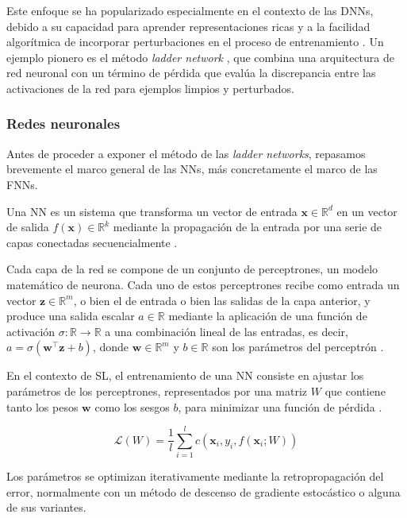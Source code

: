 Este enfoque se ha popularizado especialmente en el contexto de las \glspl{DNN}, debido a su capacidad para aprender representaciones ricas y a la facilidad algorítmica de incorporar perturbaciones en el proceso de entrenamiento \cite{van2020survey}. Un ejemplo pionero es el método \textit{ladder network} \cite{rasmus2015semi}, que combina una arquitectura de red neuronal con un término de pérdida que evalúa la discrepancia entre las activaciones de la red para ejemplos limpios y perturbados.

\subsubsection{Redes neuronales}

Antes de proceder a exponer el método de las \textit{ladder networks}, repasamos brevemente el marco general de las \glspl{NN}, más concretamente el marco de las \glspl{FNN}. 

Una \gls{NN} es un sistema que transforma un vector de entrada $\mathbf{x}\in\mathbb{R}^d$ en un vector de salida $f(\mathbf{x})\in\mathbb{R}^k$ mediante la propagación de la entrada por una serie de capas conectadas secuencialmente \cite{van2020survey}.

Cada capa de la red se compone de un conjunto de perceptrones, un modelo matemático de neurona. Cada uno de estos perceptrones recibe como entrada un vector $\mathbf{z}\in\mathbb{R}^m$, o bien el de entrada o bien las salidas de la capa anterior, y produce una salida escalar $a\in\mathbb{R}$ mediante la aplicación de una función de activación $\sigma:\mathbb{R}\to\mathbb{R}$ a una combinación lineal de las entradas, es decir, $a=\sigma(\mathbf{w}^{\top}\mathbf{z}+b)$, donde $\mathbf{w}\in\mathbb{R}^m$ y $b\in\mathbb{R}$ son los parámetros del perceptrón \cite{bishop2006pattern}.

En el contexto de \gls{SL}, el entrenamiento de una \gls{NN} consiste en ajustar los parámetros de los perceptrones, representados por una matriz $W$ que contiene tanto los pesos $\mathbf{w}$ como los sesgos $b$, para minimizar una función de pérdida \cite{van2020survey}.

\begin{equation}
    \mathcal{L}(W) = \frac{1}{l} \sum_{i=1}^l c(\mathbf{x}_i,y_i,f(\mathbf{x}_i;W))
\end{equation}

Los parámetros se optimizan iterativamente mediante la retropropagación del error, normalmente con un método de descenso de gradiente estocástico o alguna de sus variantes.

